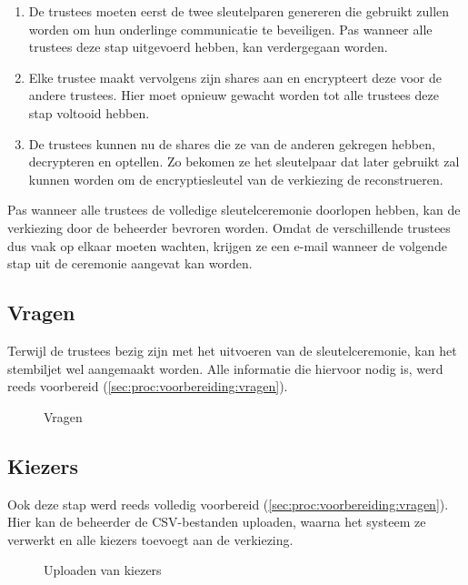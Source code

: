 \begin{enumerate}
  \item De trustees moeten eerst de twee sleutelparen genereren die gebruikt zullen worden om hun onderlinge communicatie te beveiligen. Pas wanneer alle trustees deze stap uitgevoerd hebben, kan verdergegaan worden.
  \item Elke trustee maakt vervolgens zijn shares aan en encrypteert deze voor de andere trustees. Hier moet opnieuw gewacht worden tot alle trustees deze stap voltooid hebben.
  \item De trustees kunnen nu de shares die ze van de anderen gekregen hebben, decrypteren en optellen. Zo bekomen ze het sleutelpaar dat later gebruikt zal kunnen worden om de encryptiesleutel van de verkiezing de reconstrueren.
\end{enumerate}

Pas wanneer alle trustees de volledige sleutelceremonie doorlopen hebben, kan de verkiezing door de beheerder bevroren worden. Omdat de verschillende trustees dus vaak op elkaar moeten wachten, krijgen ze een e-mail wanneer de volgende stap uit de ceremonie aangevat kan worden.

\subsection{Vragen}

Terwijl de trustees bezig zijn met het uitvoeren van de sleutelceremonie, kan het stembiljet wel aangemaakt worden. Alle informatie die hiervoor nodig is, werd reeds voorbereid (\ref{sec:proc:voorbereiding:vragen}).

\begin{figure}
  \caption{Vragen}
  \label{fig:proc:questions}
\end{figure}

\subsection{Kiezers}

Ook deze stap werd reeds volledig voorbereid (\ref{sec:proc:voorbereiding:vragen}). Hier kan de beheerder de CSV-bestanden uploaden, waarna het systeem ze verwerkt en alle kiezers toevoegt aan de verkiezing.

\begin{figure}
  \caption{Uploaden van kiezers}
  \label{fig:proc:voters_upload}
\end{figure}

